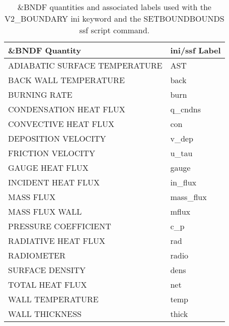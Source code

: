 \begin{table}[bph]
\begin{center}
\caption{\&BNDF quantities and associated labels used with the V2\_BOUNDARY ini keyword and the SETBOUNDBOUNDS ssf script command.}
\vspace{0.1in}
\begin{tabular}{|l|l|}
\hline
\&BNDF Quantity & ini/ssf Label \\ \hline
 ADIABATIC SURFACE TEMPERATURE  &   AST \\ \hline
 BACK WALL TEMPERATURE  &   back \\ \hline
 BURNING RATE  &   burn \\ \hline
 CONDENSATION HEAT FLUX  &   q\_cndns \\ \hline
 CONVECTIVE HEAT FLUX  &   con \\ \hline
 DEPOSITION VELOCITY  &   v\_dep \\ \hline
 FRICTION VELOCITY  &   u\_tau \\ \hline
 GAUGE HEAT FLUX  &   gauge \\ \hline
 INCIDENT HEAT FLUX  &   in\_flux \\ \hline
 MASS FLUX  &   mass\_flux \\ \hline
 MASS FLUX WALL  &   mflux \\ \hline
 PRESSURE COEFFICIENT  &   c\_p \\ \hline
 RADIATIVE HEAT FLUX  &   rad \\ \hline
 RADIOMETER  &   radio \\ \hline
 SURFACE DENSITY  &   dens \\ \hline
 TOTAL HEAT FLUX  &   net \\ \hline
 WALL TEMPERATURE  &   temp \\ \hline
 WALL THICKNESS  &   thick \\ \hline
\end{tabular}
\label{tabBNDF}
\end{center}
\end{table}
